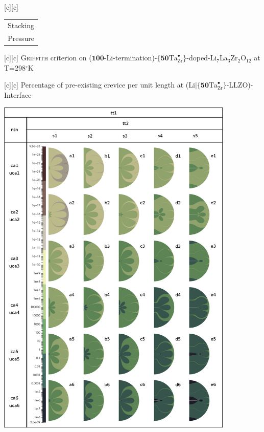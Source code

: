 [c][c] {\footnotesize \begin{tabular}{@{}c@{}} Stacking \\ Pressure \end{tabular}}

[c][c] {\footnotesize \textsc{Griffith} criterion on ($\textbf{100}$-Li-termination)-$\{\textbf{50}\text{Ta}^{\bullet}_{\text{Zr}}\}$-doped-Li$_{7}$La$_{3}$Zr$_{2}$O$_{12}$ at T=298$^{\circ}$K}

[c][c] {\footnotesize Percentage of pre-existing crevice per unit length at (Li$|$$\{\textbf{50}\text{Ta}^{\bullet}_{\text{Zr}}\}$-LLZO)-Interface}

\includegraphics[width=0.85\textwidth]{contour_figs_Griffith_xx_Ta_pressure_crevice_298K.eps}